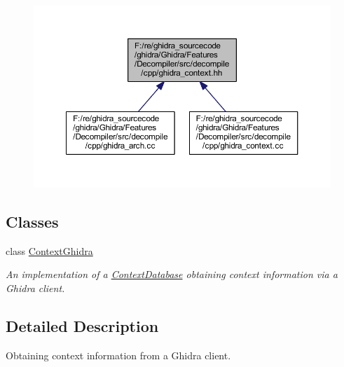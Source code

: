 \nopagebreak
\begin{figure}[H]
\begin{center}
\leavevmode
\includegraphics[width=350pt]{ghidra__context_8hh__dep__incl}
\end{center}
\end{figure}
\subsection*{Classes}
\begin{DoxyCompactItemize}
\item 
class \mbox{\hyperlink{class_context_ghidra}{Context\+Ghidra}}
\begin{DoxyCompactList}\small\item\em An implementation of a \mbox{\hyperlink{class_context_database}{Context\+Database}} obtaining context information via a Ghidra client. \end{DoxyCompactList}\end{DoxyCompactItemize}


\subsection{Detailed Description}
Obtaining context information from a Ghidra client. 

